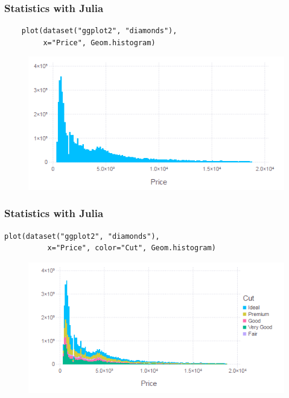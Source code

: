 \documentclass[Master.tex]{subfiles}
\begin{document}

\begin{frame}[fragile]
	\frametitle{Statistics with Julia}
	\large

\begin{verbatim}	
	plot(dataset("ggplot2", "diamonds"), 
	     x="Price", Geom.histogram)
\end{verbatim}
\begin{figure}
\centering
\includegraphics[width=0.95\linewidth]{images/histogram1}
\end{figure}

\end{frame}

\begin{frame}[fragile]
	\frametitle{Statistics with Julia}
	\large
\begin{verbatim}
plot(dataset("ggplot2", "diamonds"), 
	      x="Price", color="Cut", Geom.histogram)
\end{verbatim}
\begin{figure}
	\centering
	\includegraphics[width=0.95\linewidth]{images/histogram2}
\end{figure}
\end{frame}
\end{document}
